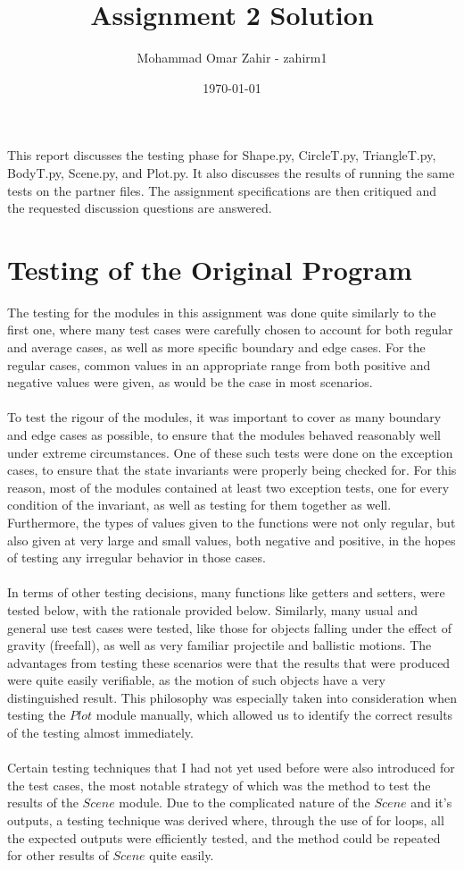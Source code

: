\documentclass[12pt]{article}
\title{Assignment 2 Solution}
\author{Mohammad Omar Zahir - zahirm1}
\date{\today}
\begin{document}
\maketitle

This report discusses the testing phase for Shape.py, CircleT.py, TriangleT.py, BodyT.py, Scene.py, and Plot.py. It also discusses the results
of running the same tests on the partner files. The assignment specifications
are then critiqued and the requested discussion questions are answered.

\section{Testing of the Original Program}
The testing for the modules in this assignment was done quite similarly to the first one, where many test cases were carefully chosen to account for both regular and average cases, as well as more specific boundary and edge cases. For the regular cases, common values in an appropriate range from both positive and negative values were given, as would be the case in most scenarios.
\\\\
To test the rigour of the modules, it was important to cover as many boundary and edge cases as possible, to ensure that the modules behaved reasonably well under extreme circumstances. One of these such tests were done on the exception cases, to ensure that the state invariants were properly being checked for. For this reason, most of the modules contained at least two exception tests, one for every condition of the invariant, as well as testing for them together as well. Furthermore, the types of values given to the functions were not only regular, but also given at very large and small values, both negative and positive, in the hopes of testing any irregular behavior in those cases.
\\\\
In terms of other testing decisions, many functions like getters and setters, were tested below, with the rationale provided below. Similarly, many usual and general use test cases were tested, like those for objects falling under the effect of gravity (freefall), as well as very familiar projectile and ballistic motions. The advantages from testing these scenarios were that the results that were produced were quite easily verifiable, as the motion of such objects have a very distinguished result. This philosophy was especially taken into consideration when testing the $Plot$ module manually, which allowed us to identify the correct results of the testing almost immediately.
\\\\
Certain testing techniques that I had not yet used before were also introduced for the test cases, the most notable strategy of which was the method to test the results of the $Scene$ module. Due to the complicated nature of the $Scene$ and it's outputs, a testing technique was derived where, through the use of for loops, all the expected outputs were efficiently tested, and the method could be repeated for other results of $Scene$ quite easily.
\end{document}
